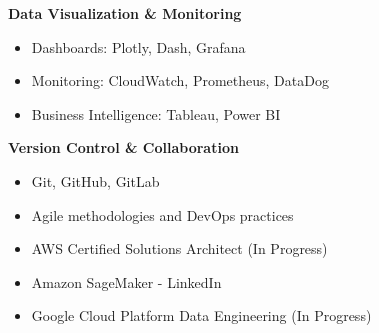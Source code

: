 \documentclass[10pt,a4paper,ragged2e,withhyper]{altacv}
\begin{document}

\textbf{Data Visualization \& Monitoring}
\begin{itemize}
  \item Dashboards: Plotly, Dash, Grafana
  \item Monitoring: CloudWatch, Prometheus, DataDog
  \item Business Intelligence: Tableau, Power BI
\end{itemize}

\textbf{Version Control \& Collaboration}
\begin{itemize}
  \item Git, GitHub, GitLab
  \item Agile methodologies and DevOps practices
\end{itemize}



\begin{itemize}[noitemsep]
    \item AWS Certified Solutions Architect (In Progress)
    \item Amazon SageMaker - LinkedIn
    \item Google Cloud Platform Data Engineering (In Progress)
\end{itemize}
\end{document}
